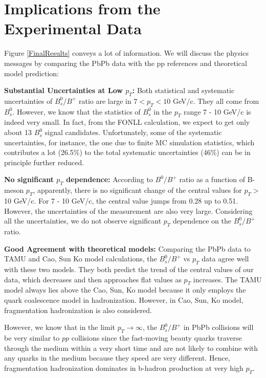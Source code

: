 \section{Implications from the Experimental Data}

Figure \ref{FinalResults} conveys a lot of information. We will discuss the physics messages by comparing the PbPb data with the pp references and theoretical model prediction:



\textbf{Substantial Uncertainties at Low $p_T$:} Both statistical and systematic uncertainties of $B^0_s/B^+$ ratio are large in $7 < p_T < 10$ GeV/c. They all come from $B^0_s$. However, we know that the statistics of $B^0_s$ in the $p_T$ range 7 - 10 GeV/c is indeed very small. In fact, from the FONLL calculation, we expect to get only about 13 $B^0_s$ signal candidates. Unfortunately, some of the systematic uncertainties, for instance, the one due to finite MC simulation statistics, which contributes a lot (26.5\%) to the total systematic uncertainties (46\%) can be in principle further reduced. 

\textbf{No significant $p_T$ dependence:} According to $B^0/B^+$ ratio as a function of B-meson $p_T$, apparently, there is no significant change of the central values for $p_T >$10 GeV/c. For 7 - 10 GeV/c, the central value jumps from 0.28 up to 0.51. However, the uncertainties of the measurement are also very large. Considering all the uncertainties, we do not observe significant $p_T$ dependence on the $B^0_s/B^+$ ratio.

\textbf{Good Agreement with theoretical models:} Comparing the PbPb data to TAMU and Cao, Sun Ko model calculations, the $B^0_s/B^+$ vs $p_T$ data agree well with these two models. They both predict the trend of the central values of our data, which decreases and then approaches flat values as $p_T$ increases. The TAMU model always lies above the Cao, Sun, Ko model because it only employs the quark coalescence model in hadronization. However, in Cao, Sun, Ko model, fragmentation hadronization is also considered. 

However, we know that in the limit $p_T \rightarrow \infty$, the $B^0_s/B^+$ in PbPb collisions will be very similar to $pp$ collisions since the fast-moving beauty quarks traverse through the medium within a very short time and are not likely to combine with any quarks in the medium because they speed are very different. Hence, fragmentation hadronization dominates in b-hadron production at very high $p_T$. 

